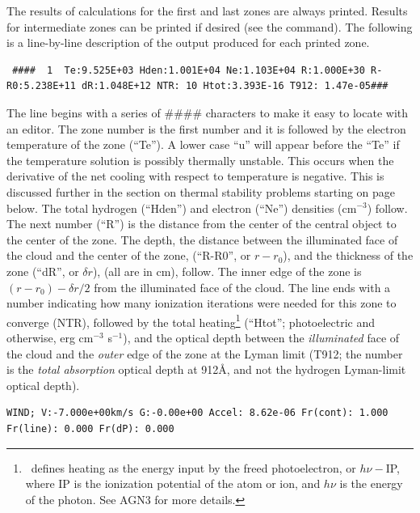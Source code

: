 The results of calculations for the first and last zones are always
printed.
Results for intermediate zones can be printed if desired (see
the  command).
The following is a line-by-line description of
the output produced for each printed zone.
{\setverbatimfontsize{\tiny}
\begin{verbatim}
 ####  1  Te:9.525E+03 Hden:1.001E+04 Ne:1.103E+04 R:1.000E+30 R-R0:5.238E+11 dR:1.048E+12 NTR: 10 Htot:3.393E-16 T912: 1.47e-05###
\end{verbatim}
}

The line begins with a series of \#\#\#\# characters to make it easy
to locate with an editor.
The zone number is the first number and it is
followed by the electron temperature of the zone (``Te'').
A lower case
``u'' will appear before the ``Te'' if the temperature solution is possibly
thermally unstable.
This occurs when the derivative of the net cooling
with respect to temperature is negative.
This is discussed further in the
section on thermal stability problems starting on page
\pageref{sec:ThermalStabilityProblems} below.
The total hydrogen (``Hden'')
and electron (``Ne'') densities (cm$^{-3}$) follow.
The next number (``R'')
is the distance from the center of the central object to the center of the
zone.
The depth, the distance between the illuminated face of the cloud
and the center of the zone, (``R-R0'', or $r-r_0$),
and the thickness of
the zone (``dR'', or $\delta r$), (all are in cm), follow.
The inner edge of the
zone is $( {r - {r_0}} ) - \delta r/2$
from the illuminated face of the cloud.
The line ends with a number
indicating how many ionization iterations were needed for this zone to
converge (NTR), followed by the total heating\footnote{\Cloudy\ defines heating as the energy input by the freed photoelectron,
or $h\nu - $IP, where IP is the ionization potential of the atom or ion, and
$h\nu$ is the energy of the photon.  See AGN3 for more details.} (``Htot''; photoelectric
and otherwise, erg cm$^{-3}$ s$^{-1}$),
and the optical depth between the
\emph{illuminated}
face of the cloud and the \emph{outer} edge of the zone at the Lyman limit (T912;
the number is the \emph{total absorption} optical depth at 912\AA,
and not the
hydrogen Lyman-limit optical depth).
{\setverbatimfontsize{\tiny}
\begin{verbatim}
WIND; V:-7.000e+00km/s G:-0.00e+00 Accel: 8.62e-06 Fr(cont): 1.000 Fr(line): 0.000 Fr(dP): 0.000
\end{verbatim}
}

